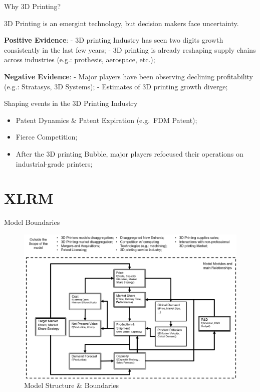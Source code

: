 \documentclass[12pt,ignorenonframetext,]{beamer}
\providecommand{\tightlist}{%
  \setlength{\itemsep}{0pt}\setlength{\parskip}{0pt}}
\begin{document}
\begin{frame}{Why 3D Printing?}

3D Printing is an emergint technology, but decision makers face
uncertainty.

\textbf{Positive Evidence}: - 3D printing Industry has seen two digits
growth consistently in the last few years; - 3D printing is already
reshaping supply chains across industries (e.g.: prothesis, aerospace,
etc.);

\textbf{Negative Evidence}: - Major players have been observing
declining profitability (e.g.: Stratasys, 3D Systems); - Estimates of 3D
printing growth diverge;

\end{frame}

\begin{frame}{Shaping events in the 3D Printing Industry}

\begin{itemize}
\tightlist
\item
  Patent Dynamics \& Patent Expiration (e.g.~FDM Patent);
\item
  Fierce Competition;
\item
  After the 3D printing Bubble, major players refocused their operations
  on industrial-grade printers;
\end{itemize}

\end{frame}

\section{XLRM}\label{xlrm}

\begin{frame}{Model Boundaries}

\begin{figure}
\centering
\includegraphics{images/model-modules-and-boundaries.png}
\caption{Model Structure \& Boundaries}
\end{figure}

\end{frame}
\end{document}
